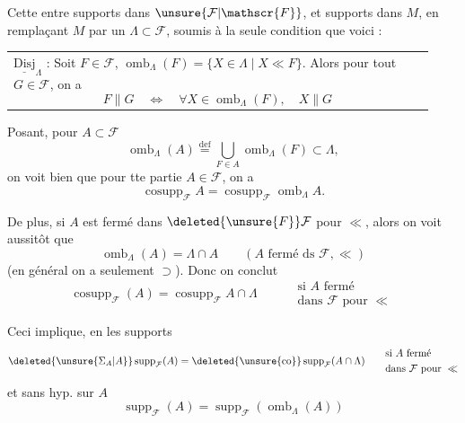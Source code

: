 


Cette  entre supports dans $\unsure{\mathcal{F}|\mathscr{F}}$, et supports dans $M$,  en remplaçant $M$ par un  $\Lambda\subset\mathcal{F}$, soumis à la seule condition que voici :

\noindent\begin{tabular}{|p{0.93\linewidth}}
$\underline{\mathrm{Disj}}_\Lambda$ : Soit $F\in\mathcal{F}$, $\operatorname{omb}_\Lambda(F)=\{X\in\Lambda\mid X\ll F\}$.
Alors pour tout $G\in\mathcal{F}$, on a
\[
F\parallel G\quad\Longleftrightarrow\quad\forall X\in\operatorname{omb}_\Lambda(F),\quad X\parallel G
\]
\end{tabular}

Posant, pour $A\subset\mathcal{F}$
\[
\operatorname{omb}_\Lambda(A)\overset{\mathrm{def}}{=}\bigcup_{F\in A}\operatorname{omb}_\Lambda(F)\subset\Lambda,
\]
on voit bien que pour tte partie $A\in\mathcal{F}$, on a
\[
\operatorname{cosupp}_{\mathcal{F}}A=\operatorname{cosupp}_{\mathcal{F}}\operatorname{omb}_\Lambda A.
\]

De plus, si $A$ est fermé dans $\deleted{\unsure{F}}\mathcal{F}$ pour $\ll$, alors on voit aussitôt que
\[
\operatorname{omb}_\Lambda(A)=\Lambda\cap A\qquad(A\text{ fermé ds }\mathcal{F},\ll)
\]
(en général on a seulement $\supset$). Donc on conclut
\[
\operatorname{cosupp}_{\mathcal{F}}(A)=\operatorname{cosupp}_{\mathcal{F}}A\cap\Lambda
\qquad\begin{aligned}&\text{si }A\text{ fermé}\\&\text{dans }\mathcal{F}\text{ pour }\ll\end{aligned}
\]

Ceci implique, en  les supports
\[
\deleted{\unsure{\Sigma_A|A}}\operatorname{supp}_{\mathcal{F}}(A)=\deleted{\unsure{\mathrm{co}}}\operatorname{supp}_{\mathcal{F}}(A\cap\Lambda)
\qquad\begin{aligned}&\text{si }A\text{ fermé}\\&\text{dans }\mathcal{F}\text{ pour }\ll\end{aligned}
\]
et sans hyp. sur $A$
\[
\operatorname{supp}_{\mathcal{F}}(A)=\operatorname{supp}_{\mathcal{F}}(\operatorname{omb}_\Lambda(A))
\]
